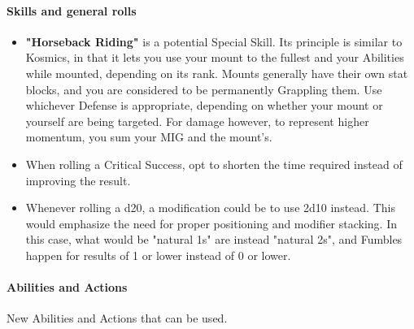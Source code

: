 \paragraph{Skills and general rolls}

\begin{itemize}
    \item \textbf{"Horseback Riding"} is a potential Special Skill. Its principle is similar to Kosmics, in that it lets you use your mount to the fullest and your Abilities while mounted, depending on its rank. Mounts generally have their own stat blocks, and you are considered to be permanently Grappling them. Use whichever Defense is appropriate, depending on whether your mount or yourself are being targeted. For damage however, to represent higher momentum, you sum your MIG and the mount's.
    \item When rolling a Critical Success, opt to shorten the time required instead of improving the result.
    \item Whenever rolling a d20, a modification could be to use 2d10 instead. This would emphasize the need for proper positioning and modifier stacking. In this case, what would be "natural 1s" are instead "natural 2s", and Fumbles happen for results of 1 or lower instead of 0 or lower.
\end{itemize}

\paragraph{Abilities and Actions}

New Abilities and Actions that can be used.

